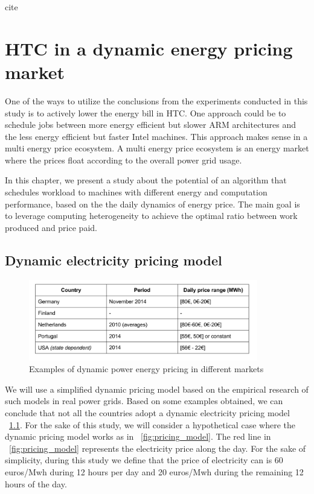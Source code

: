 cite\chapter{HTC in a dynamic energy pricing market}

One of the ways to utilize the conclusions from the experiments conducted in this study is to actively lower the energy bill in HTC. One approach could be to schedule jobs between more energy efficient but slower ARM architectures and the less energy efficient but faster Intel machines. This approach makes sense in a multi energy price ecosystem. A multi energy price ecosystem is an energy market where the prices float according to the overall power grid usage.

In this chapter, we present a study about the potential of an algorithm that schedules workload to machines with different energy and computation performance, based on the the daily dynamics of energy price. The main goal is to leverage computing heterogeneity to achieve the optimal ratio between work produced and price paid.  

\section{Dynamic electricity pricing model}

\begin{figure}[hours]
  \centering
    \includegraphics[width=100mm]{"img/pricing_model_table"}
    \caption{Examples of dynamic power energy pricing in different markets}
    \label{fig:pricing_model_table}
\end{figure}

We will use a simplified dynamic pricing model based on the empirical research of such models in real power grids. Based on some examples obtained, we can conclude that not all the countries adopt a dynamic electricity pricing model ~\ref{fig:pricing_model_table}. For the sake of this study, we will consider a hypothetical case where the dynamic pricing model works as in ~\ref{fig:pricing_model}. The red line in ~\ref{fig:pricing_model} represents the electricity price along the day. For the sake of simplicity, during this study we define that the price of electricity can is  60 euros/Mwh during 12 hours per day and 20 euros/Mwh during the remaining 12 hours of the day.  
	
